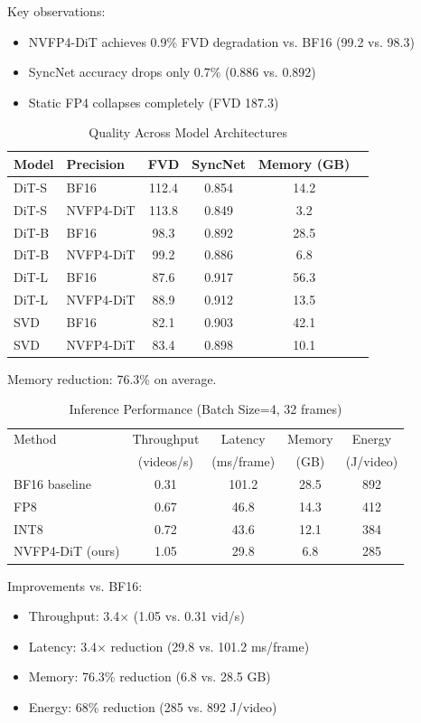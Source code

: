 \documentclass[journal]{IEEEtran}
\theoremstyle{definition}
\theoremstyle{remark}
\begin{document}
Key observations:
\begin{itemize}
    \item NVFP4-DiT achieves 0.9\% FVD degradation vs. BF16 (99.2 vs. 98.3)
    \item SyncNet accuracy drops only 0.7\% (0.886 vs. 0.892)
    \item Static FP4 collapses completely (FVD 187.3)
\end{itemize}

\begin{table}[t]
\centering
\caption{Quality Across Model Architectures}
\label{tab:architectures}
\begin{tabular}{llcccc}
\toprule
Model & Precision & FVD & SyncNet & Memory (GB) \\
\midrule
DiT-S & BF16 & 112.4 & 0.854 & 14.2 \\
DiT-S & NVFP4-DiT & 113.8 & 0.849 & 3.2 \\
\midrule
DiT-B & BF16 & 98.3 & 0.892 & 28.5 \\
DiT-B & NVFP4-DiT & 99.2 & 0.886 & 6.8 \\
\midrule
DiT-L & BF16 & 87.6 & 0.917 & 56.3 \\
DiT-L & NVFP4-DiT & 88.9 & 0.912 & 13.5 \\
\midrule
SVD & BF16 & 82.1 & 0.903 & 42.1 \\
SVD & NVFP4-DiT & 83.4 & 0.898 & 10.1 \\
\bottomrule
\end{tabular}
\end{table}

Memory reduction: 76.3\% on average.

\begin{table}[t]
\centering
\caption{Inference Performance (Batch Size=4, 32 frames)}
\label{tab:inference}
\begin{tabular}{lcccc}
\toprule
Method & Throughput & Latency & Memory & Energy \\
& (videos/s) & (ms/frame) & (GB) & (J/video) \\
\midrule
BF16 baseline & 0.31 & 101.2 & 28.5 & 892 \\
FP8 & 0.67 & 46.8 & 14.3 & 412 \\
INT8 & 0.72 & 43.6 & 12.1 & 384 \\
NVFP4-DiT (ours) & 1.05 & 29.8 & 6.8 & 285 \\
\bottomrule
\end{tabular}
\end{table}

Improvements vs. BF16:
\begin{itemize}
    \item Throughput: 3.4$\times$ (1.05 vs. 0.31 vid/s)
    \item Latency: 3.4$\times$ reduction (29.8 vs. 101.2 ms/frame)
    \item Memory: 76.3\% reduction (6.8 vs. 28.5 GB)
    \item Energy: 68\% reduction (285 vs. 892 J/video)
\end{itemize}
\end{document}
